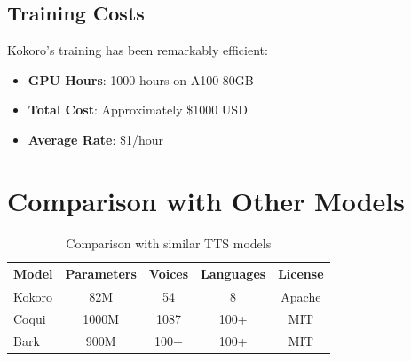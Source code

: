 \subsection{Training Costs}
\label{subsec:training-costs}

Kokoro's training has been remarkably efficient:
\begin{itemize}
	\item \textbf{GPU Hours}: 1000 hours on A100 80GB
	\item \textbf{Total Cost}: Approximately \$1000 USD
	\item \textbf{Average Rate}: \$1/hour
\end{itemize}

\section{Comparison with Other Models}
\label{sec:model-comparison}

\begin{table}[H]
	\centering
	\label{tab:model-comparison}
	\begin{tabular}{|l|c|c|c|c|}
		\hline
		\textbf{Model} & \textbf{Parameters} & \textbf{Voices} & \textbf{Languages} & \textbf{License} \\
		\hline
		Kokoro          & 82M                 & 54             & 8                & Apache            \\
		\hline
		Coqui           & 1000M               & 1087           & 100+             & MIT               \\
		\hline
		Bark            & 900M                & 100+           & 100+             & MIT               \\
		\hline
	\end{tabular}
	\caption{Comparison with similar TTS models}
\end{table}